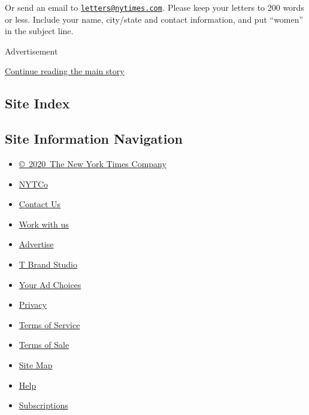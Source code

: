 Or send an email to
\href{mailto:letters@nytimes.com}{\nolinkurl{letters@nytimes.com}}\emph{.}
Please keep your letters to 200 words or less. Include your name,
city/state and contact information, and put ``women'' in the subject
line.

Advertisement

\protect\hyperlink{after-bottom}{Continue reading the main story}

\hypertarget{site-index}{%
\subsection{Site Index}\label{site-index}}

\hypertarget{site-information-navigation}{%
\subsection{Site Information
Navigation}\label{site-information-navigation}}

\begin{itemize}
\tightlist
\item
  \href{https://help.nytimes.com/hc/en-us/articles/115014792127-Copyright-notice}{©~2020~The
  New York Times Company}
\end{itemize}

\begin{itemize}
\tightlist
\item
  \href{https://www.nytco.com/}{NYTCo}
\item
  \href{https://help.nytimes.com/hc/en-us/articles/115015385887-Contact-Us}{Contact
  Us}
\item
  \href{https://www.nytco.com/careers/}{Work with us}
\item
  \href{https://nytmediakit.com/}{Advertise}
\item
  \href{http://www.tbrandstudio.com/}{T Brand Studio}
\item
  \href{https://www.nytimes.com/privacy/cookie-policy\#how-do-i-manage-trackers}{Your
  Ad Choices}
\item
  \href{https://www.nytimes.com/privacy}{Privacy}
\item
  \href{https://help.nytimes.com/hc/en-us/articles/115014893428-Terms-of-service}{Terms
  of Service}
\item
  \href{https://help.nytimes.com/hc/en-us/articles/115014893968-Terms-of-sale}{Terms
  of Sale}
\item
  \href{https://spiderbites.nytimes.com}{Site Map}
\item
  \href{https://help.nytimes.com/hc/en-us}{Help}
\item
  \href{https://www.nytimes.com/subscription?campaignId=37WXW}{Subscriptions}
\end{itemize}
